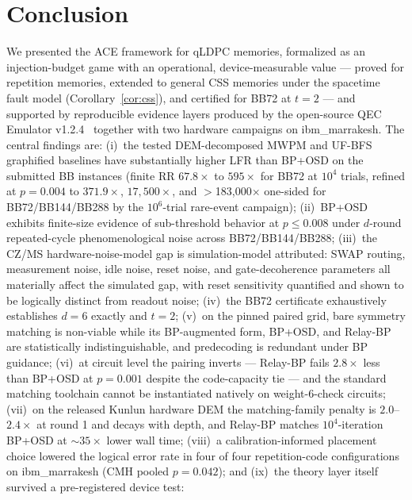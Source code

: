 \documentclass[11pt,a4paper]{article}
\begin{document}
\section{Conclusion}

We presented the ACE framework for qLDPC memories, formalized as an
injection-budget game with an operational, device-measurable value ---
proved for repetition memories, extended to general CSS memories under
the spacetime fault model (Corollary~\ref{cor:css}), and certified for
BB72 at $t=2$ --- and supported by reproducible evidence layers
produced by the open-source
QEC Emulator v1.2.4~\cite{AlDaajeh2026emulator} together with two
hardware campaigns on ibm\_marrakesh.
The central findings are:
(i)~the tested DEM-decomposed MWPM and UF-BFS graphified baselines have substantially higher LFR than BP+OSD on the submitted BB instances (finite RR $67.8\times$ to $595\times$ for BB72 at $10^{4}$ trials,
refined at $p=0.004$ to $371.9\times$, $17{,}500\times$, and
$>$183{,}000$\times$ one-sided for BB72/BB144/BB288 by the $10^{6}$-trial
rare-event campaign);
(ii)~BP+OSD exhibits finite-size evidence of sub-threshold behavior at $p\le0.008$ under
$d$-round repeated-cycle phenomenological noise across BB72/BB144/BB288;
(iii)~the CZ/MS hardware-noise-model gap is simulation-model attributed: SWAP routing, measurement noise, idle noise, reset noise, and gate-decoherence parameters all materially affect the simulated gap, with reset sensitivity quantified and shown to be logically distinct from readout noise;
(iv)~the BB72 certificate exhaustively establishes $d=6$ exactly and $t=2$;
(v)~on the pinned paired grid, bare symmetry matching is non-viable while its BP-augmented form, BP+OSD, and Relay-BP are statistically indistinguishable, and predecoding is redundant under BP guidance;
(vi)~at circuit level the pairing inverts --- Relay-BP fails
$2.8\times$ less than BP+OSD at $p=0.001$ despite the code-capacity
tie --- and the standard matching toolchain cannot be instantiated
natively on weight-6-check circuits;
(vii)~on the released Kunlun hardware DEM the matching-family penalty
is $2.0$--$2.4\times$ at round 1 and decays with depth, and Relay-BP
matches $10^4$-iteration BP+OSD at $\sim\!35\times$ lower wall time;
(viii)~a calibration-informed placement choice lowered the logical
error rate in four of four repetition-code configurations on
ibm\_marrakesh (CMH pooled $p=0.042$);
and (ix)~the theory layer itself survived a pre-registered device test:
\end{document}
